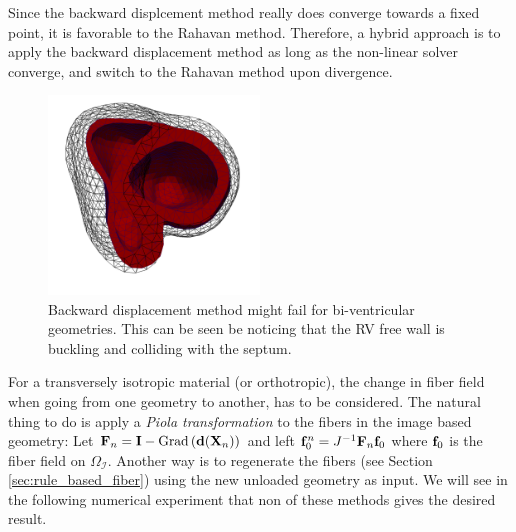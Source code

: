 Since the backward displcement method really does converge towards a
fixed point, it is favorable to the Rahavan method. Therefore, a
hybrid approach is to apply the backward displacement method as
long as the non-linear solver converge, and switch to the Rahavan
method upon divergence.

\begin{figure}[htbp]
  \centering
    \includegraphics[width=0.5\textwidth]{chapters/introduction/figures/unloading_fail/unloading_fail.png}
\caption{Backward displacement method might fail for bi-ventricular
  geometries. This can be seen be noticing that the RV free wall is
  buckling and colliding with the septum.}
\label{fig:unloading_fail}
\end{figure}


For a transversely isotropic material (or orthotropic), the change in
fiber field when going from one geometry to another, has to be
considered. The natural thing to do is apply a \emph{Piola
  transformation} to the fibers in the image based geometry: Let
$\mathbf{F}_{n}= \mathbf{I} - \mathrm{Grad} \left(\mathbf{d}(\mathbf{X}_n) \right)$ and left
$\mathbf{f}_0^{n} = J^{-1}\mathbf{F}_{n} \mathbf{f}_0$ where $\mathbf{f}_0$ is the fiber field on
$\Omega_{\mathcal{I}}$. Another way is to regenerate the fibers (see
Section \ref{sec:rule_based_fiber}) using the new unloaded geometry as
input. We will see in the following numerical experiment that non of
these methods gives the desired result.











